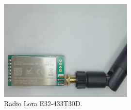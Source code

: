 



\begin{figure}[ht]
    \centering
    \caption{Radio Lora E32-433T30D.}
    \begin{center}
        \includegraphics[width=0.6\textwidth]{img/Modulo RF Lora.jpg}
    \end{center}
    \vspace{-0.5cm}
   \label{fig:RadioLora}
\end{figure}